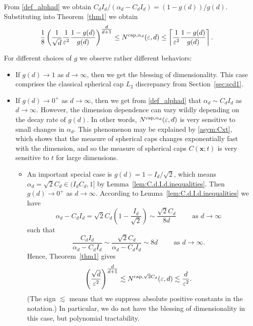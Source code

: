 \documentclass[12pt]{article}
\newcommand{\cp}{{\rm cap}}
\begin{document}
From \eqref{def_alphad} we obtain $C_d I_d/(\alpha_d- C_d I_d)=(1-g(d))/g(d)$. Substituting into Theorem~\ref{thm1} we obtain 
\begin{equation*}
\frac{1}{8} \left( \frac{1}{\sqrt{d}} \frac{1}{\varepsilon^2} \frac{1-g(d)}{g(d)} \right)^{\tfrac{d}{d+1}}  \le N^{\cp,\alpha_d}(\varepsilon, d) \le \left\lceil \frac{1}{\varepsilon^2} \frac{1-g(d)}{g(d)}\right\rceil.
\end{equation*}


For different choices of $g$ we observe rather different behaviors:
\begin{itemize}
\item If $g(d) \to 1$ as $d \to \infty$, then we get the blessing of dimensionality. This case comprises the classical spherical cap $L_2$ discrepancy from Section~\ref{sec:scd1}. 


\item If $g(d) \to 0^+$ as $d \to \infty$, then we get from \eqref{def_alphad} that $\alpha_d \sim C_d I_d$ as $d\to \infty$. However, the dimension dependence can vary wildly depending on the decay rate of $g(d)$. In other words, $N^{\cp,\alpha_d}(\varepsilon, d)$ is very sensitive to small changes in $\alpha_d$. This phenomenon may be explained by \eqref{asym:Cxt}, which shows that the measure of spherical caps changes exponentially fast with the dimension, and so the measure of spherical caps $C(\bm{x};t)$ is very sensitive to $t$ for large dimensions.
\begin{itemize}
\item An important special case is $g(d)=1-I_d/\sqrt{2}$, which means $\alpha_d = \sqrt{2} C_d \in (I_d C_d, 1]$ by Lemma~\ref{lem:C.d.I.d.inequalities}. Then $g(d)\rightarrow 0^+$ as $d \to \infty$. According to Lemma~\ref{lem:C.d.I.d.inequalities} we have  
\begin{equation*}
\alpha_d - C_d I_d = \sqrt{2} C_d \left(1 - \frac{I_d}{\sqrt{2}}\right) \sim  \frac{\sqrt{2} C_d}{8d} \qquad \mbox{ as } d \to \infty
\end{equation*}
such that $$\frac{C_d I_d}{\alpha_d - C_d I_d} \sim \frac{\sqrt{2} C_d}{\alpha_d - C_d I_d} \sim 8 d  \qquad \mbox{ as } d \to \infty.$$
Hence, Theorem~\ref{thm1} gives
\begin{equation}\label{Nsqrt2Cd}
\left( \frac{ \sqrt{d} }{\varepsilon^2}  \right)^{\tfrac{d}{d+1}} \lesssim N^{\cp,\sqrt{2} C_d}(\varepsilon, d) \lesssim \frac{ d }{\varepsilon^2}.
\end{equation}
(The sign $\lesssim$ means that we suppress absolute positive constants in the notation.) In particular, we do not have the blessing of dimensionality in this case, but polynomial tractability. 


\end{itemize}
\end{itemize}
\end{document}
